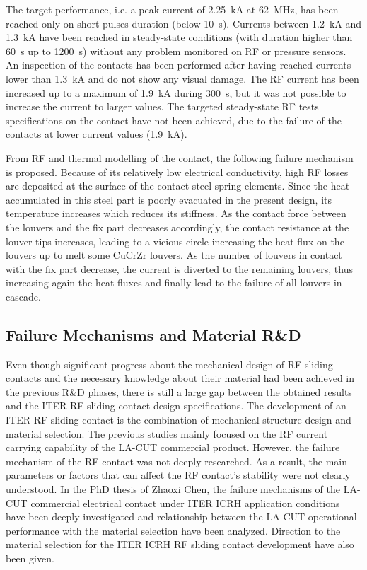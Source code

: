 {The target performance, i.e. a peak current of 2.25~kA at 62~MHz, has been reached only on short pulses duration (below 10~s). Currents between 1.2~kA and 1.3~kA have been reached in steady-state conditions (with duration higher than 60~s up to 1200~s) without any problem monitored on RF or pressure sensors. An inspection of the contacts has been performed after having reached currents lower than 1.3~kA and do not show any visual damage. The RF current has been increased up to a maximum of 1.9~kA during 300~s, but it was not possible to increase the current to larger values. The targeted steady-state RF tests specifications on the contact have not been achieved, due to the failure of the contacts at lower current values (1.9~kA). 

From RF and thermal modelling of the contact, the following failure mechanism is proposed. Because of its relatively low electrical conductivity, high RF losses are deposited at the surface of the contact steel spring elements. Since the heat accumulated in this steel part is poorly evacuated in the present design, its temperature increases which reduces its stiffness. As the contact force between the louvers and the fix part decreases accordingly, the contact resistance at the louver tips increases, leading to a vicious circle increasing the heat flux on the louvers up to melt some CuCrZr louvers. As the number of louvers in contact with the fix part decrease, the current is diverted to the remaining louvers, thus increasing again the heat fluxes and finally lead to the failure of all louvers in cascade. 



\subsection{Failure Mechanisms and Material R\&D}
Even though significant progress about the mechanical design of RF sliding contacts and the necessary knowledge about their material had been achieved in the previous R\&D phases, there is still a large gap between the obtained results and the ITER RF sliding contact design specifications. The development of an ITER RF sliding contact is the combination of mechanical structure design and material selection. The previous studies mainly focused on the RF current carrying capability of the LA-CUT commercial product. However, the failure mechanism of the RF contact was not deeply researched. As a result, the main parameters or factors that can affect the RF contact's stability were not clearly understood. In the PhD thesis of Zhaoxi Chen, the failure mechanisms of the LA-CUT commercial electrical contact under ITER ICRH application conditions have been deeply investigated and relationship between the LA-CUT operational performance with the material selection have been analyzed. Direction to the material selection for the ITER ICRH RF sliding contact development have also been given. 

}
